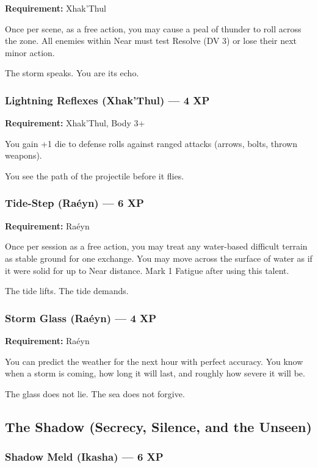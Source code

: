 \textbf{Requirement:} Xhak'Thul

Once per scene, as a free action, you may cause a peal of thunder to roll across the zone. All enemies within Near must test Resolve (DV 3) or lose their next minor action.

The storm speaks. You are its echo.

\subsubsection{Lightning Reflexes (Xhak'Thul) — 4 XP}

\textbf{Requirement:} Xhak'Thul, Body 3+

You gain +1 die to defense rolls against ranged attacks (arrows, bolts, thrown weapons).

You see the path of the projectile before it flies.

\subsubsection{Tide-Step (Raéyn) — 6 XP}

\textbf{Requirement:} Raéyn

Once per session as a free action, you may treat any water-based difficult terrain as stable ground for one exchange. You may move across the surface of water as if it were solid for up to Near distance. Mark 1 Fatigue after using this talent.

The tide lifts. The tide demands.

\subsubsection{Storm Glass (Raéyn) — 4 XP}

\textbf{Requirement:} Raéyn

You can predict the weather for the next hour with perfect accuracy. You know when a storm is coming, how long it will last, and roughly how severe it will be.

The glass does not lie. The sea does not forgive.

\subsection{The Shadow (Secrecy, Silence, and the Unseen)}

\subsubsection{Shadow Meld (Ikasha) — 6 XP}

